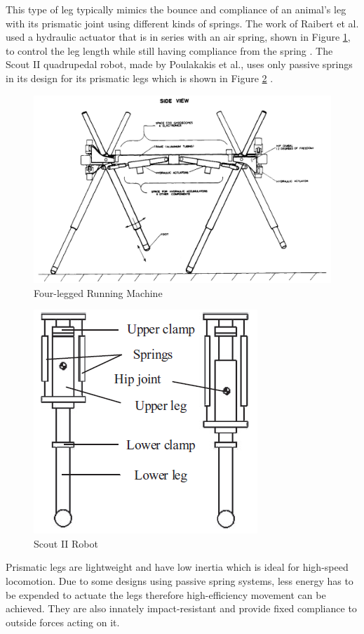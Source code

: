 \documentclass[english]{upeeei}
\begin{document}
This type of leg typically mimics the bounce and compliance of an animal's leg with its prismatic joint using different kinds of springs. The work of Raibert et al. used a hydraulic actuator that is in series with an air spring, shown in Figure \ref{fig:quad-running-robot}, to control the leg length while still having compliance from the spring \cite{quadrunningrobot}. The Scout II quadrupedal robot, made by Poulakakis et al., uses only passive springs in its design for its prismatic legs which is shown in Figure \ref{fig:scout-ii} \cite{quadrobotlegs, scoutii}.

\begin{figure}[H]
\begin{centering}
\includegraphics[width=0.75\columnwidth]{images/quad_running_robot}
\par\end{centering}
\caption{Four-legged Running Machine\label{fig:quad-running-robot}}
\end{figure}

\begin{figure}[H]
\begin{centering}
\includegraphics[width=0.3\columnwidth]{images/scout_ii}
\par\end{centering}
\caption{Scout II Robot\label{fig:scout-ii}}
\end{figure}

Prismatic legs are lightweight and have low inertia which is ideal for high-speed locomotion. Due to some designs using passive spring systems, less energy has to be expended to actuate the legs therefore high-efficiency movement can be achieved. They are also innately impact-resistant and provide fixed compliance to outside forces acting on it.
\end{document}
